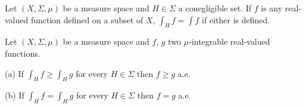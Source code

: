  Let $(X,\Sigma,\mu)$ be a measure space and
$H\in\Sigma$ a conegligible set.   If $f$ is any real-valued function
defined on a subset of $X$, $\int_Hf=\int f$ if either is defined.


 Let $(X,\Sigma,\mu)$ be a measure space and $f$,
$g$ two $\mu$-integrable real-valued functions.

(a) If $\int_Hf\ge\int_Hg$ for every $H\in\Sigma$ then $f\ge g$ a.e.

(b) If $\int_Hf=\int_Hg$ for every $H\in\Sigma$ then $f=g$ a.e.


